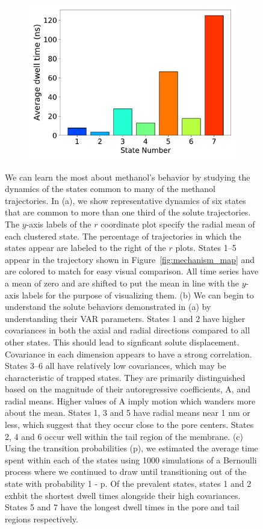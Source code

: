 \documentclass{article}
\begin{document}
\begin{figure}
\begin{subfigure}{0.35\textwidth}
  \caption{}\label{fig:A_sigma_scatter_MET}
  \includegraphics[width=\textwidth]{dwell_times_MET.pdf}  %
  \caption{}\label{fig:dwell_times_MET}
  \end{subfigure}
  \caption{We can learn the most about methanol's behavior by studying the dynamics
  of the states common to many of the methanol trajectories. In (a), we show representative
  dynamics of six states that are common to more than one third of the solute trajectories. 
  The $y$-axis labels of the $r$ coordinate plot specify the radial mean of each clustered 
  state. The percentage of trajectories in which the states appear are labeled to the right of
  the $r$ plots. States 1--5 appear in the trajectory shown in Figure~\ref{fig:mechanism_map}
  and are colored to match for easy visual comparison. All time series have a mean of zero and are
  shifted to put the mean in line with the $y$-axis labels for the purpose of visualizing them. 
  (b) We can begin to understand the solute behaviors demonstrated in (a) by understanding their VAR 
  parameters. States 1 and 2 have higher covariances in both the axial and radial directions compared
  to all other states. This should lead to signficant solute displacement. Covariance in each dimension
  appears to have a strong correlation. States 3--6 all have relatively low covariances, which may
  be characteristic of trapped states. They are primarily distinguished based on the magnitude of their 
  autoregressive coefficients, A, and radial means. Higher values of A imply motion which wanders 
  more about the mean. States 1, 3 and 5 have radial means near 1 nm or less, which suggest that they
  occur close to the pore centers. States 2, 4 and 6 occur well within the tail region of the membrane.
  (c) Using the transition probabilities (p), we estimated the average time spent within each 
  of the states using 1000 simulations of a Bernoulli process where we continued to draw until transitioning
  out of the state with probability 1 - p. Of the prevalent states, states 1 and 
  2 exhbit the shortest dwell times alongside their high covariances. States 5 and 7 have the longest dwell times in the pore and tail regions respectively.
  }\label{fig:common_states_MET}
  \end{figure}
  
\end{document}
